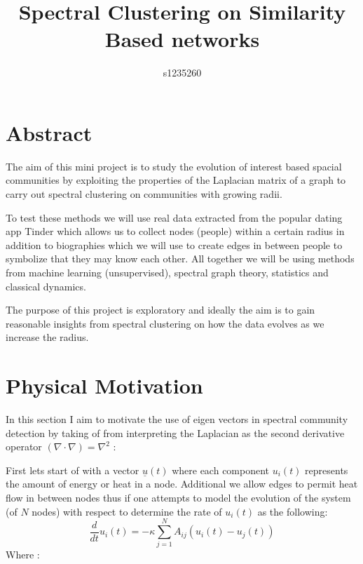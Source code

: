 \documentclass[10pt,twocolumn]{article}
\begin{document}
\title{Spectral Clustering on Similarity Based networks}
\author{s1235260}
\maketitle 




\section{Abstract}
The aim of this mini project is to study the evolution of interest based spacial communities by exploiting the properties of the Laplacian matrix of a graph to carry out spectral clustering on communities with growing radii. 


 To test these methods we will use real data extracted from the popular dating app Tinder which allows us to collect nodes (people) within a certain radius in addition to biographies which we will use to create edges in between people to symbolize that they may know each other.
\newline
All together we will be using methods from machine learning (unsupervised), spectral graph theory, statistics and classical dynamics.

The purpose of this project is exploratory and ideally the aim is to gain reasonable insights from spectral clustering on how the data evolves as we increase the radius.

\section{Physical Motivation}
In this section I aim to motivate the use of eigen vectors in spectral community detection by
taking of from interpreting the Laplacian as the second derivative operator $(\nabla \cdot \nabla) = \nabla^{2}$ :

First lets start of with a vector $\underline{u}(t)$
where each component $u_{i}(t)$ represents the amount of energy or heat in a node. Additional we allow edges to permit heat flow in between nodes thus if one attempts to model the evolution of the system (of $N$ nodes) with respect to determine the rate of $u_{i}(t)$  as the following:
\[
\frac{d}{dt}u_{i}(t) = -\kappa \sum_{j=1}^{N}A_{ij}(u_{i}(t) -u_{j}(t))
\]
Where :
\end{document}
